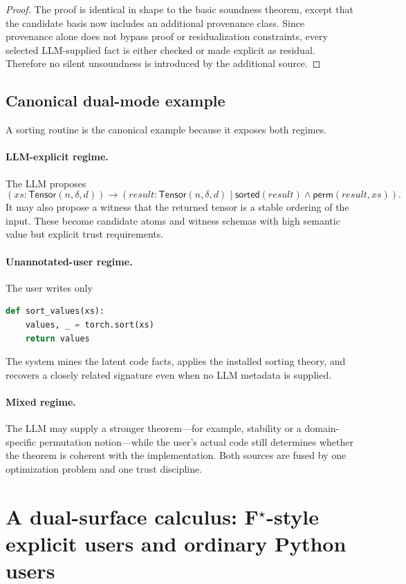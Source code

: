 \documentclass[11pt]{article}
\theoremstyle{definition}
\theoremstyle{plain}
\begin{document}
\begin{proof}
The proof is identical in shape to the basic soundness theorem, except that the
candidate basis now includes an additional provenance class. Since provenance
alone does not bypass proof or residualization constraints, every selected
LLM-supplied fact is either checked or made explicit as residual. Therefore no
silent unsoundness is introduced by the additional source.
\end{proof}

\subsection{Canonical dual-mode example}
A sorting routine is the canonical example because it exposes both regimes.

\paragraph{LLM-explicit regime.}
The LLM proposes
\[
(xs : \mathsf{Tensor}(n,\delta,d)) \to
(result : \mathsf{Tensor}(n,\delta,d) \mid
\mathsf{sorted}(result) \wedge \mathsf{perm}(result,xs)).
\]
It may also propose a witness that the returned tensor is a stable ordering of
the input. These become candidate atoms and witness schemas with high semantic
value but explicit trust requirements.

\paragraph{Unannotated-user regime.}
The user writes only
\begin{lstlisting}[style=deppy,language=Python]
def sort_values(xs):
    values, _ = torch.sort(xs)
    return values
\end{lstlisting}
The system mines the latent code facts, applies the installed sorting theory,
and recovers a closely related signature even when no LLM metadata is supplied.

\paragraph{Mixed regime.}
The LLM may supply a stronger theorem---for example, stability or a domain-
specific permutation notion---while the user's actual code still determines
whether the theorem is coherent with the implementation. Both sources are fused
by one optimization problem and one trust discipline.


\section{A dual-surface calculus: F$^\star$-style explicit users and ordinary Python users}
\end{document}

